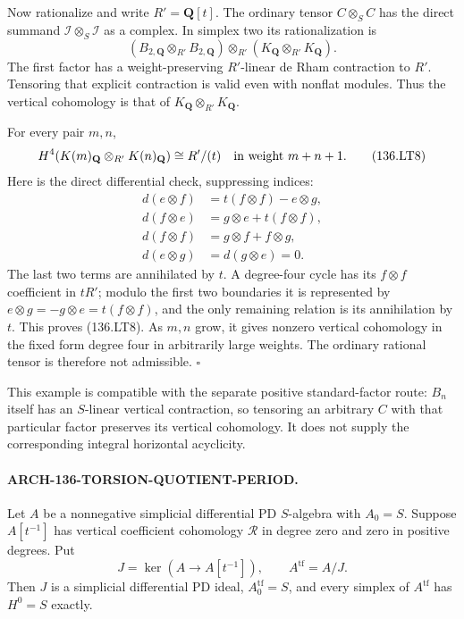 Now rationalize and write \(R'=\mathbf Q[t]\). The ordinary
tensor \(C\otimes_SC\) has the direct summand
\(\mathcal I\otimes_S\mathcal I\) as a complex. In simplex two
its rationalization is
\[
 (B_{2,\mathbf Q}\otimes_{R'}B_{2,\mathbf Q})
       \otimes_{R'}(K_{\mathbf Q}\otimes_{R'}K_{\mathbf Q}).
 \]
The first factor has a weight-preserving \(R'\)-linear
de Rham contraction to \(R'\). Tensoring that explicit
contraction is valid even with nonflat modules. Thus the
vertical cohomology is that of \(K_{\mathbf Q}\otimes_{R'}K_{\mathbf Q}\).

For every pair \(m,n\),
\[
 H^4(K(m)_{\mathbf Q}\otimes_{R'}K(n)_{\mathbf Q})
           \cong R'/(t)
 \quad\hbox{in weight }m+n+1.
 \tag{136.LT8}
\]
Here is the direct differential check, suppressing indices:
\[
 \begin{split}
 d(e\otimes f)&=t(f\otimes f)-e\otimes g,\\
 d(f\otimes e)&=g\otimes e+t(f\otimes f),\\
 d(f\otimes f)&=g\otimes f+f\otimes g,\\
 d(e\otimes g)&=d(g\otimes e)=0.
 \end{split}
 \]
The last two terms are annihilated by \(t\).
A degree-four cycle has its \(f\otimes f\) coefficient in
\(tR'\); modulo the first two boundaries it is represented
by \(e\otimes g=-g\otimes e=t(f\otimes f)\), and the only
remaining relation is its annihilation by \(t\).
This proves (136.LT8). As \(m,n\) grow, it gives nonzero
vertical cohomology in the fixed form degree four in
arbitrarily large weights. The ordinary rational tensor is
therefore not admissible.
\hfill\(\square\)

This example is compatible with the separate positive
standard-factor route: \(B_n\) itself has an \(S\)-linear
vertical contraction, so tensoring an arbitrary \(C\) with
that particular factor preserves its vertical cohomology.
It does not supply the corresponding integral horizontal
acyclicity.

\paragraph{ARCH-136-TORSION-QUOTIENT-PERIOD.}
Let \(A\) be a nonnegative simplicial differential PD
\(S\)-algebra with \(A_0=S\). Suppose \(A[t^{-1}]\) has
vertical coefficient cohomology \(\mathcal R\) in degree
zero and zero in positive degrees. Put
\[
 J=\ker(A\longrightarrow A[t^{-1}]),\qquad A^{\mathrm{tf}}=A/J.
 \tag{136.LT9}
\]
Then \(J\) is a simplicial differential PD ideal,
\(A^{\mathrm{tf}}_0=S\), and every simplex of
\(A^{\mathrm{tf}}\) has \(H^0=S\) exactly.

